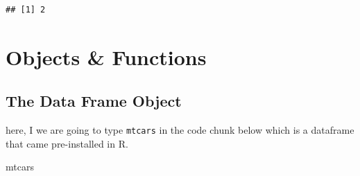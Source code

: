 \documentclass[
]{book}
\newenvironment{Shaded}{\begin{snugshade}}{\end{snugshade}}
\newcommand{\NormalTok}[1]{#1}
\begin{document}
\begin{verbatim}
## [1] 2
\end{verbatim}

\hypertarget{objects-functions}{%
\section{Objects \& Functions}\label{objects-functions}}

\hypertarget{the-data-frame-object}{%
\subsection{The Data Frame Object}\label{the-data-frame-object}}

here, I we are going to type \texttt{mtcars} in the code chunk below which is a dataframe that came pre-installed in R.

\begin{Shaded}
\begin{Highlighting}[]
\NormalTok{mtcars}
\end{Highlighting}
\end{Shaded}
\end{document}
